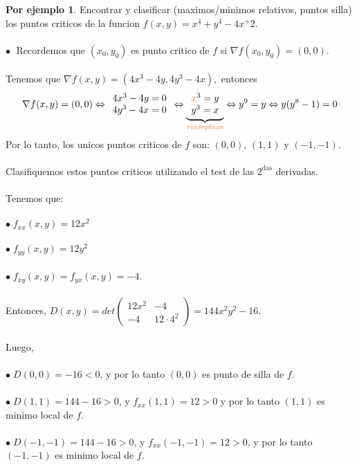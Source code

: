 \documentclass{article}
\theoremstyle{definition}
\theoremstyle{definition}
\newtheorem*{ej}{Por ejemplo}
\theoremstyle{remark}
\newcommand\bl{$\bullet\;$}
\begin{document}
\begin{ej}
  Encontrar y clasificar (maximos/minimos relativos, puntos silla) los puntos criticos de la funcion \mbox{$f(x,y)=x^4+y^4-4x^+2$}. \\\\
  \textcolor{azulp2}{\bl} Recordemos que $(x_0,y_0)$ es punto critico de $f$ si $\nabla f (x_0,y_0) =(0,0)$. \\\\ Tenemos que $\nabla f(x,y)=(4x^3-4y,4y^3-4x),$ entonces \[ 
    \nabla f(x,y)=(0,0) \Leftrightarrow \begin{array}{l}
4x^3-4y=0 \\
4y^3-4x=0
\end{array} \Leftrightarrow \underbrace{\begin{array}{l}
  \textcolor{rojop2}{x}^3=y \\
y^3 = x
\end{array}}_{\textcolor{rojop2}{reemplazo}} \Leftrightarrow y^9=y \Leftrightarrow y(y^8-1)=0 
  \] Por lo tanto, los unicos puntos criticos de $f$ son: $(0,0)$, $(1,1)$ y $(-1,-1)$. \\ \pagebreak \\
  Clasifiquemos estos puntos criticos utilizando el test de las $2^{\text{das}}$ derivadas.\\\\ Tenemos que: \\\\
  \bl $f_{xx}(x,y)=12x^2$ \\\\
  \bl $f_{yy}(x,y)=12y^2$ \\\\
  \bl $f_{xy}(x,y)=f_{yx}(x,y)=-4$. \\\\
  Entonces, $D(x,y)=det\left(\begin{array}{cc}
      12x^2 & -4 \\ 
      -4 & 12\cdot 4^2
  \end{array}\right)=144x^2y^2-16$.\\\\
  Luego, \\\\
  \bl $D(0,0)=-16<0$, y por lo tanto $(0,0)$ es punto de silla de $f$. \\\\
  \bl $D(1,1)=144-16>0$, y $f_{xx}(1,1)=12>0$ y por lo tanto $(1,1)$ es minimo local de $f$. \\\\
  \bl $D(-1,-1)=144-16>0$, y $f_{xx}(-1,-1)=12>0$, y por lo tanto $(-1,-1)$ es minimo local de $f$.
\end{ej}\pagebreak
\end{document}
